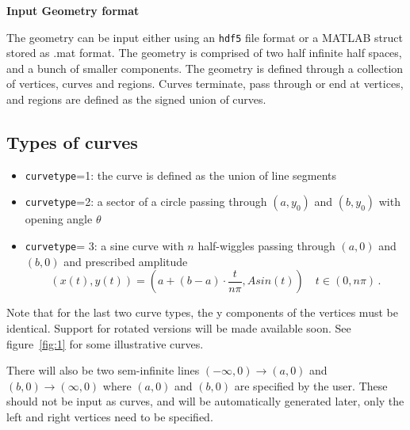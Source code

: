 \documentclass[11pt]{article}
\theoremstyle{definition}
\theoremstyle{remark}
\numberwithin{equation}{section}
\begin{document}



  \vspace{4\baselineskip}

  {\raggedright
  \LARGE \sffamily\bfseries Input Geometry format\\}
    \hrulefill
  
  


 \vspace{\baselineskip}

The geometry can be input either using an \texttt{hdf5} file format or a MATLAB struct stored as .mat format. The geometry is comprised of two half infinite half spaces, and a bunch of smaller components. The geometry is defined through a collection of vertices, curves and regions. Curves terminate, pass through or end at vertices, and regions are defined as the signed union of curves.  

\subsection{Types of curves}
\begin{itemize}
\item \texttt{curvetype}=1: the curve is defined as the union of line segments
\item \texttt{curvetype}=2: a sector of a circle passing through $(a,y_{0})$ and $(b,y_{0})$ with opening angle $\theta$ 
\item \texttt{curvetype}= 3: a sine curve with $n$ half-wiggles passing through $(a,0)$ and $(b,0)$ and prescribed amplitude
\begin{equation}
(x(t),y(t)) = \left(a + (b-a)\cdot \frac{t}{n\pi}, Asin(t) \right) \quad t\in (0,n\pi) \, .
\end{equation}
\end{itemize}
Note that for the last two curve types, the y components of the vertices must be identical. Support for rotated versions will be made available soon. See figure~\cref{fig:1} for some illustrative curves.

There will also be two sem-infinite lines $(-\infty,0) \to (a,0)$ and $(b,0) \to (\infty,0)$ where $(a,0)$ and $(b,0)$ are specified by the user. These should not be input as curves, and will be automatically generated later, only the left and right vertices need to be specified.
\end{document}
